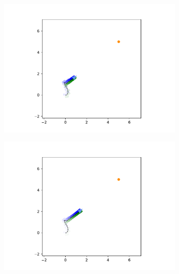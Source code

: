 \documentclass[main.tex]{subfiles}
\begin{document}
\begin{figure}[h]
\begin{subfigure}{0.20\textwidth}
        \includegraphics[width=\textwidth]{figures/Simulations/sim1/frame_2.pdf}
    \end{subfigure}%
    \hfill
    \begin{subfigure}{0.20\textwidth}
        \centering
        \includegraphics[width=\textwidth]{figures/Simulations/sim1/frame_3.pdf}
    \end{subfigure}%
    \hfill
    \begin{subfigure}{0.20\textwidth}
        \centering

\end{subfigure}
\end{figure}
\end{document}
